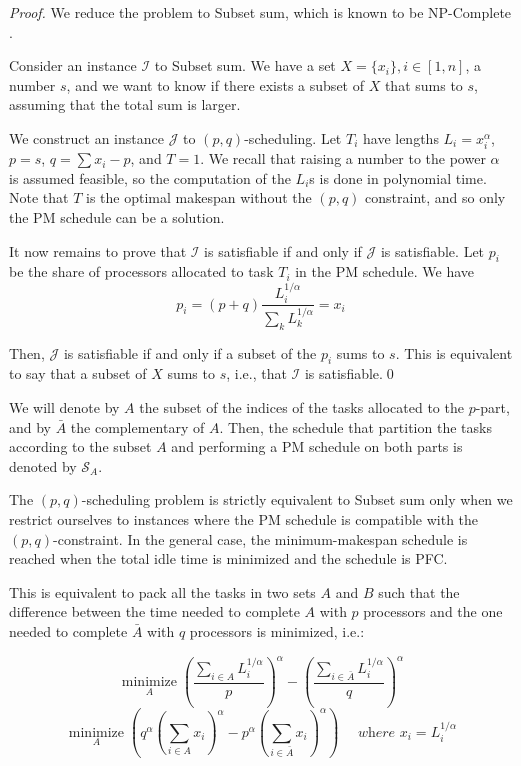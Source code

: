 \documentclass{llncs}
\newcommand{\s}{\mathcal S\xspace}
\newif\iflong
\begin{document}
\iflong \begin{proof}
We reduce the problem to {\sc Subset sum}, which is known to be NP-Complete \cite{gareyjohnson}.

Consider an instance $\mathcal{I}$ to {\sc Subset sum}. We have a set $X=\{x_i\}, i\in[1,n]$, a number $s$, and we want to know if there exists a subset of $X$ that sums to $s$, assuming that the total sum is larger.

We construct an instance $\mathcal{J}$ to $(p,q)$-scheduling. Let $T_i$ have lengths $L_i = x_i^{\alpha}$, $p=s$, $q=\sum x_i -p$, and $T=1$. We recall that raising a number to the power $\alpha$ is assumed feasible, so the computation of the $L_i$s is done in polynomial time. Note that $T$ is the optimal makespan without the $(p,q)$ constraint, and so only the PM schedule can be a solution.

It now remains to prove that $\mathcal{I}$ is satisfiable if and only if $\mathcal{J}$ is satisfiable.
Let $p_i$ be the share of processors allocated to task $T_i$ in the PM schedule. We have $$\displaystyle p_i = (p+q) \frac{L_i^{1/\alpha}}{ \sum_k L_k^{1/\alpha}} = x_i$$

Then, $\mathcal{J}$ is satisfiable if and only if a subset of the  $p_i$ sums to $s$. This is equivalent to say that a subset of $X$ sums to $s$, i.e., that $\mathcal{I}$ is satisfiable.\qed
\end{proof}



We will denote by $A$ the subset of the indices of the tasks allocated
to the $p$-part, and by $\bar A$ the complementary of $A$. Then, the
schedule that partition the tasks according to the subset $A$ and
performing a PM schedule on both parts is denoted by $\s_A$.



The $(p,q)$-scheduling problem is strictly equivalent to {\sc Subset sum} only when we restrict ourselves to instances where the PM schedule is compatible with the $(p,q)$-constraint. In the general case, the minimum-makespan schedule is reached when  the total idle time is minimized and the schedule is PFC.

This is equivalent to pack all the tasks in two sets $A$ and $B$ such that the difference between the time needed to complete $A$ with $p$ processors and the one needed to complete $\bar A$ with $q$ processors is minimized, i.e.:

$$\mathop{\mathrm{minimize}}\limits_{A} \left(\frac{\sum_{i\in A} L_i^{1/\alpha}}{p}\right)^\alpha - \left(\frac{\sum_{i\in \bar A} L_i^{1/\alpha}}{q}\right)^\alpha$$
$$ \mathop{\mathrm{minimize}}\limits_{A} \left(q^\alpha\left(\sum_{i\in A} x_i\right)^\alpha - p^\alpha\left(\sum_{i\in \bar A} x_i\right)^\alpha\right) \quad \textit{ where $x_i=L_i^{1/\alpha}$}$$
\end{document}
